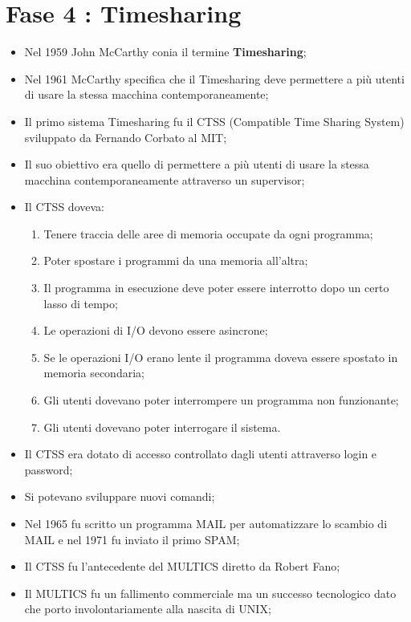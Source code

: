 \section{Fase 4 : Timesharing}

\begin{itemize}
    \item Nel 1959 John McCarthy conia il termine \textbf{Timesharing};
    \item Nel 1961 McCarthy specifica che il Timesharing deve permettere
    a più utenti di usare la stessa macchina contemporaneamente;
    \item Il primo sistema Timesharing fu il CTSS (Compatible Time Sharing System)
    sviluppato da Fernando Corbato al MIT;
    \item Il suo obiettivo era quello di permettere a più utenti di usare
    la stessa macchina contemporaneamente attraverso un supervisor;
    \item Il CTSS doveva:
    \begin{enumerate}
        \item Tenere traccia delle aree di memoria occupate da ogni programma;
        \item Poter spostare i programmi da una memoria all'altra;
        \item Il programma in esecuzione deve poter essere interrotto dopo un certo lasso di tempo;
        \item Le operazioni di I/O devono essere asincrone;
        \item Se le operazioni I/O erano lente il programma doveva essere spostato in memoria secondaria;
        \item Gli utenti dovevano poter interrompere un programma non funzionante;
        \item Gli utenti dovevano poter interrogare il sistema.
    \end{enumerate}
    \item Il CTSS era dotato di accesso controllato dagli utenti attraverso
    login e password;
    \item Si potevano sviluppare nuovi comandi;
    \item Nel 1965  fu scritto un programma MAIL per automatizzare lo scambio di MAIL
    e nel 1971 fu inviato il primo SPAM;
    \item Il CTSS fu l'antecedente del MULTICS diretto da Robert Fano;
    \item Il MULTICS fu un fallimento commerciale ma un successo tecnologico
    dato che porto involontariamente alla nascita di UNIX;

\end{itemize}
